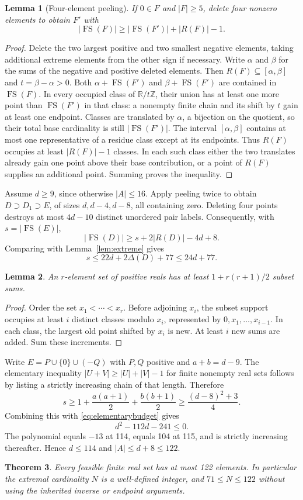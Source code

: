\documentclass[11pt,a4paper]{article}
\newtheorem{theorem}{Theorem}[section]
\newtheorem{lemma}[theorem]{Lemma}
\theoremstyle{remark}\newtheorem{remark}[theorem]{Remark}
\newcommand{\FS}{\operatorname{FS}}
\newcommand{\R}{\mathbb R}\newcommand{\Z}{\mathbb Z}
\begin{document}
\begin{lemma}[Four-element peeling]\label{lem:peeling}
If $0\in F$ and $|F|\ge5$, delete four nonzero elements to obtain $F'$ with
\[|\FS(F)|\ge|\FS(F')|+|R(F)|-1.\]
\end{lemma}
\begin{proof}
Delete the two largest positive and two smallest negative elements, taking additional extreme elements from the other sign if necessary. Write $\alpha$ and $\beta$ for the sums of the negative and positive deleted elements. Then $R(F)\subseteq[\alpha,\beta]$ and $t=\beta-\alpha>0$.
Both $\alpha+\FS(F')$ and $\beta+\FS(F')$ are contained in $\FS(F)$. In every occupied class of $\R/t\Z$, their union has at least one more point than $\FS(F')$ in that class: a nonempty finite chain and its shift by $t$ gain at least one endpoint. Classes are translated by $\alpha$, a bijection on the quotient, so their total base cardinality is still $|\FS(F')|$.
The interval $[\alpha,\beta]$ contains at most one representative of a residue class except at its endpoints. Thus $R(F)$ occupies at least $|R(F)|-1$ classes. In each such class either the two translates already gain one point above their base contribution, or a point of $R(F)$ supplies an additional point. Summing proves the inequality.
\end{proof}

Assume $d\ge9$, since otherwise $|A|\le16$. Apply peeling twice to obtain $D\supset D_1\supset E$, of sizes $d,d-4,d-8$, all containing zero. Deleting four points destroys at most $4d-10$ distinct unordered pair labels. Consequently, with $s=|\FS(E)|$,
\[|\FS(D)|\ge s+2|R(D)|-4d+8.\]
Comparing with Lemma~\ref{lem:extreme} gives
\begin{equation}\label{eq:elementarybudget}
 s\le22d+2\Delta(D)+77\le24d+77.
\end{equation}

\begin{lemma}\label{lem:positive}
An $r$-element set of positive reals has at least $1+r(r+1)/2$ subset sums.
\end{lemma}
\begin{proof}
Order the set $x_1<\cdots<x_r$. Before adjoining $x_i$, the subset support occupies at least $i$ distinct classes modulo $x_i$, represented by $0,x_1,\ldots,x_{i-1}$. In each class, the largest old point shifted by $x_i$ is new. At least $i$ new sums are added. Sum these increments.
\end{proof}
Write $E=P\cup\{0\}\cup(-Q)$ with $P,Q$ positive and $a+b=d-9$. The elementary inequality $|U+V|\ge|U|+|V|-1$ for finite nonempty real sets follows by listing a strictly increasing chain of that length. Therefore
\[
 s\ge1+\frac{a(a+1)}2+\frac{b(b+1)}2
 \ge\frac{(d-8)^2+3}{4}.
\]
Combining this with \eqref{eq:elementarybudget} gives
\[d^2-112d-241\le0.\]
The polynomial equals $-13$ at 114, equals 104 at 115, and is strictly increasing thereafter. Hence $d\le114$ and $|A|\le d+8\le122$.
\begin{theorem}\label{thm:cap}
Every feasible finite real set has at most 122 elements. In particular the extremal cardinality $N$ is a well-defined integer, and $71\le N\le122$ without using the inherited inverse or endpoint arguments.
\end{theorem}
\end{document}
